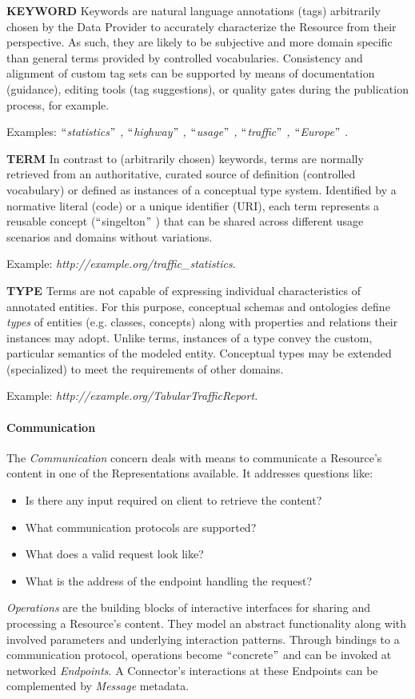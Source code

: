 \textbf{KEYWORD} Keywords are natural language annotations (tags) arbitrarily chosen by the Data Provider to accurately characterize the Resource from their perspective. As such, they are likely to be subjective and more domain specific than general terms provided by controlled vocabularies. Consistency and alignment of custom tag sets can be supported by means of documentation (guidance), editing tools (tag suggestions), or quality gates during the publication process, for example. 

Examples: \textit{$``$statistics$"$ , $``$highway$"$ , $``$usage$"$ , $``$traffic$"$ , $``$Europe$"$ .}

\textbf{TERM} In contrast to (arbitrarily chosen) keywords, terms are normally retrieved from an authoritative, curated source of definition (controlled vocabulary) or defined as instances of a conceptual type system. Identified by a normative literal (code) or a unique identifier (URI), each term represents a reusable concept ($``$singelton$"$ ) that can be shared across different usage scenarios and domains without variations. 

Example: \textit{http://example.org/traffic\_statistics}. 

\textbf{TYPE} Terms are not capable of expressing individual characteristics of annotated entities. For this purpose, conceptual schemas and ontologies define \textit{types} of entities (e.g. classes, concepts) along with properties and relations their instances may adopt. Unlike terms, instances of a type convey the custom, particular semantics of the modeled entity. Conceptual types may be extended (specialized) to meet the requirements of other domains. 

Example: \textit{http://example.org/TabularTrafficReport.}\par

\paragraph{Communication\\}


The \textit{Communication }concern deals with means to communicate a Resource’s content in one of the Representations available. It addresses questions like:  \begin{itemize}
	\item Is there any input required on client to retrieve the content?  	
	\item What communication protocols are supported? 
 	\item What does a valid request look like? 
 	\item What is the address of the endpoint handling the request?
\end{itemize} 
 \textit{Operations} are the building blocks of interactive interfaces for sharing and processing a Resource’s content. They model an abstract functionality along with involved parameters and underlying interaction patterns. Through bindings to a communication protocol, operations become $``$concrete$"$  and can be invoked at networked \textit{Endpoints}. A Connector’s interactions at these Endpoints can be complemented by \textit{Message} metadata.


